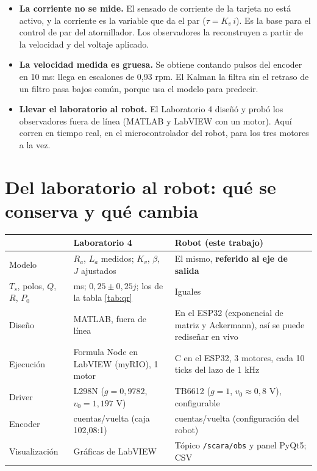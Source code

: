 \documentclass[11pt]{article}
\newcommand{\cod}[1]{\texttt{#1}}
\begin{document}
\begin{itemize}
  \item \textbf{La corriente no se mide.} El sensado de corriente de la tarjeta no está activo, y la corriente es la variable que da el par ($\tau=K_v\,i$). Es la base para el control de par del atornillador. Los observadores la reconstruyen a partir de la velocidad y del voltaje aplicado.
  \item \textbf{La velocidad medida es gruesa.} Se obtiene contando pulsos del encoder en 10 ms: llega en escalones de 0,93 rpm. El Kalman la filtra sin el retraso de un filtro pasa bajos común, porque usa el modelo para predecir.
  \item \textbf{Llevar el laboratorio al robot.} El Laboratorio 4 diseñó y probó los observadores fuera de línea (MATLAB y LabVIEW con un motor). Aquí corren en tiempo real, en el microcontrolador del robot, para los tres motores a la vez.
\end{itemize}

\section{Del laboratorio al robot: qué se conserva y qué cambia}

\begin{table}[H]\centering\small
\begin{tabular}{>{\raggedright\arraybackslash}p{3.3cm}>{\raggedright\arraybackslash}p{5.4cm}>{\raggedright\arraybackslash}p{6.8cm}}
\toprule
 & Laboratorio 4 & Robot (este trabajo) \\
\midrule
Modelo & $R_a$, $L_a$ medidos; $K_v$, $\beta$, $J$ ajustados & El mismo, \textbf{referido al eje de salida} \\
$T_s$, polos, $Q$, $R$, $P_0$ & 10 ms; $0{,}25\pm0{,}25j$; los de la tabla \ref{tab:qr} & Iguales \\
Diseño & MATLAB, fuera de línea & En el ESP32 (exponencial de matriz y Ackermann), así se puede rediseñar en vivo \\
Ejecución & Formula Node en LabVIEW (myRIO), 1 motor & C en el ESP32, 3 motores, cada 10 ticks del lazo de 1 kHz \\
Driver & L298N ($g=0{,}9782$, $v_0=1{,}197$ V) & TB6612 ($g=1$, $v_0\approx0{,}8$ V), configurable \\
Encoder & 6533 cuentas/vuelta (caja 102,08:1) & 6424 cuentas/vuelta (configuración del robot) \\
Visualización & Gráficas de LabVIEW & Tópico \cod{/scara/obs} y panel PyQt5; CSV \\
\bottomrule
\end{tabular}
\end{table}
\end{document}
